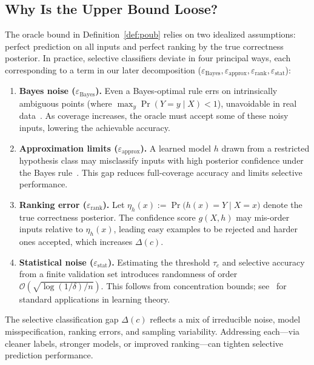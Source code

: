 \subsection{Why Is the Upper Bound Loose?}
\label{sec:why-loose}

The oracle bound in Definition~\ref{def:poub} relies on two idealized
assumptions: perfect prediction on all inputs and perfect ranking by
the true correctness posterior. In practice, selective classifiers deviate in
four principal ways, each corresponding to a term in our later
decomposition (\(\varepsilon_{\text{Bayes}},\varepsilon_{\text{approx}},
\varepsilon_{\text{rank}},\varepsilon_{\text{stat}}\)):

\begin{enumerate}

\item \textbf{Bayes noise (\(\varepsilon_{\text{Bayes}}\)).}  
  Even a Bayes-optimal rule errs on intrinsically ambiguous points
(where \(\max_y \Pr(Y=y\mid X)<1\)), unavoidable in real data~\citep{devroye2013probabilistic}.  
As coverage increases, the oracle must accept some of these noisy inputs, lowering the achievable accuracy.


\item \textbf{Approximation limits (\(\varepsilon_{\text{approx}}\)).}  
  A learned model \(h\) drawn from a restricted hypothesis class may
  misclassify inputs with high posterior confidence under the Bayes rule~\citep{bishop2006pattern}.  
  This gap reduces full-coverage accuracy and limits selective performance.

\item \textbf{Ranking error (\(\varepsilon_{\text{rank}}\)).}  
  Let \(\eta_h(x):=\Pr\bigl(h(x)=Y\mid X=x\bigr)\) denote the true
  correctness posterior. The confidence score \(g(X,h)\) may
  mis-order inputs relative to \(\eta_h(x)\), leading easy examples
  to be rejected and harder ones accepted, which increases \(\Delta(c)\).  

\item \textbf{Statistical noise (\(\varepsilon_{\text{stat}}\)).}  
  Estimating the threshold \(\tau_c\) and selective accuracy from a finite validation set introduces randomness
  of order \(\mathcal{O}(\sqrt{\log(1/\delta)/n})\). This follows from concentration bounds; see~\citet{shalev2014understanding} for standard applications in learning theory.

\end{enumerate}

\begin{takeaway}
The selective classification gap \(\Delta(c)\) reflects a mix of irreducible noise,
model misspecification, ranking errors, and sampling variability. Addressing each—via cleaner labels,
stronger models, or improved ranking—can tighten selective prediction performance.
\end{takeaway}

